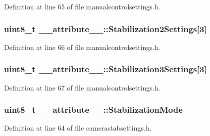\-Definition at line 65 of file manualcontrolsettings.\-h.

\hypertarget{struct____attribute_____a9dd594e2e3ae12c5abf6dc7c142456e4}{
\subsubsection[{\-Stabilization2\-Settings}]{\setlength{\rightskip}{0pt plus 5cm}uint8\-\_\-t {\bf \-\_\-\-\_\-attribute\-\_\-\-\_\-\-::\-Stabilization2\-Settings}\mbox{[}3\mbox{]}}}\label{struct____attribute_____a9dd594e2e3ae12c5abf6dc7c142456e4}


\-Definition at line 66 of file manualcontrolsettings.\-h.

\hypertarget{struct____attribute_____a99adb7bc6e9224f6882e354533589805}{
\subsubsection[{\-Stabilization3\-Settings}]{\setlength{\rightskip}{0pt plus 5cm}uint8\-\_\-t {\bf \-\_\-\-\_\-attribute\-\_\-\-\_\-\-::\-Stabilization3\-Settings}\mbox{[}3\mbox{]}}}\label{struct____attribute_____a99adb7bc6e9224f6882e354533589805}


\-Definition at line 67 of file manualcontrolsettings.\-h.

\hypertarget{struct____attribute_____ac3fd3464f708b6c06c34461c5a74a97e}{
\subsubsection[{\-Stabilization\-Mode}]{\setlength{\rightskip}{0pt plus 5cm}uint8\-\_\-t {\bf \-\_\-\-\_\-attribute\-\_\-\-\_\-\-::\-Stabilization\-Mode}}}\label{struct____attribute_____ac3fd3464f708b6c06c34461c5a74a97e}


\-Definition at line 64 of file camerastabsettings.\-h.

